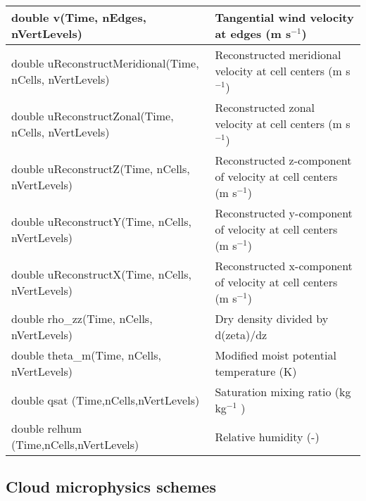 {\small        
\begin{longtable}{|p{2.5in} |p{3.75in}|}
 \hline
        double v(Time, nEdges, nVertLevels)          &        Tangential wind velocity at edges (m s$^{-1}$)  \\ \hline 
        double uReconstructMeridional\hfil\break (Time, nCells, nVertLevels)  & Reconstructed meridional velocity at cell centers (m s$^{-1}$)  \\ \hline
        double uReconstructZonal\hfil\break (Time, nCells, nVertLevels)  &      Reconstructed zonal velocity at cell centers \hfil\break (m s$^{-1}$) \\ \hline
        double uReconstructZ\hfil\break (Time, nCells, nVertLevels)      &      Reconstructed z-component of velocity at cell centers \hfil\break (m s$^{-1}$) \\ \hline
        double uReconstructY\hfil\break (Time, nCells, nVertLevels)      &      Reconstructed y-component of velocity at cell centers \hfil\break (m s$^{-1}$) \\ \hline
        double uReconstructX\hfil\break (Time, nCells, nVertLevels)      &      Reconstructed x-component of velocity at cell centers \hfil\break (m s$^{-1}$)  \\ \hline
        double \hfil\break rho\_zz(Time, nCells, nVertLevels)   &  Dry density divided by d(zeta)/dz \\ \hline
        double \hfil\break theta\_m(Time, nCells, nVertLevels)  &  Modified moist potential temperature (K) \\ \hline
        double qsat \hfill\break(Time,nCells,nVertLevels) & Saturation mixing ratio  (kg kg$^{-1}$ ) \\ \hline
        double relhum \hfill\break(Time,nCells,nVertLevels) & Relative humidity (-) \\ \hline
\end{longtable}
}


\subsection{Cloud microphysics schemes}


